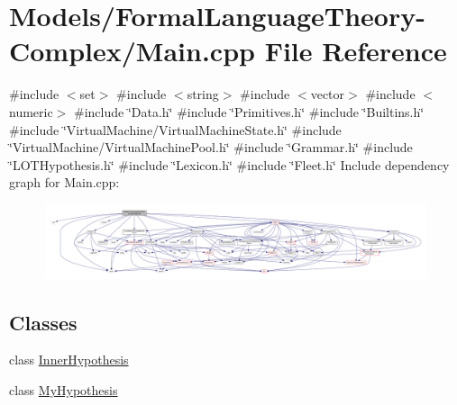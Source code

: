 \hypertarget{_models_2_formal_language_theory-_complex_2main_8cpp}{}\section{Models/\+Formal\+Language\+Theory-\/\+Complex/\+Main.cpp File Reference}
\label{_models_2_formal_language_theory-_complex_2main_8cpp}
{\ttfamily \#include $<$set$>$}\newline
{\ttfamily \#include $<$string$>$}\newline
{\ttfamily \#include $<$vector$>$}\newline
{\ttfamily \#include $<$numeric$>$}\newline
{\ttfamily \#include \char`\"{}Data.\+h\char`\"{}}\newline
{\ttfamily \#include \char`\"{}Primitives.\+h\char`\"{}}\newline
{\ttfamily \#include \char`\"{}Builtins.\+h\char`\"{}}\newline
{\ttfamily \#include \char`\"{}Virtual\+Machine/\+Virtual\+Machine\+State.\+h\char`\"{}}\newline
{\ttfamily \#include \char`\"{}Virtual\+Machine/\+Virtual\+Machine\+Pool.\+h\char`\"{}}\newline
{\ttfamily \#include \char`\"{}Grammar.\+h\char`\"{}}\newline
{\ttfamily \#include \char`\"{}L\+O\+T\+Hypothesis.\+h\char`\"{}}\newline
{\ttfamily \#include \char`\"{}Lexicon.\+h\char`\"{}}\newline
{\ttfamily \#include \char`\"{}Fleet.\+h\char`\"{}}\newline
Include dependency graph for Main.\+cpp\+:
\nopagebreak
\begin{figure}[H]
\begin{center}
\leavevmode
\includegraphics[width=350pt]{_models_2_formal_language_theory-_complex_2main_8cpp__incl}
\end{center}
\end{figure}
\subsection*{Classes}
\begin{DoxyCompactItemize}
\item 
class \hyperlink{class_inner_hypothesis}{Inner\+Hypothesis}
\item 
class \hyperlink{class_my_hypothesis}{My\+Hypothesis}
\end{DoxyCompactItemize}
